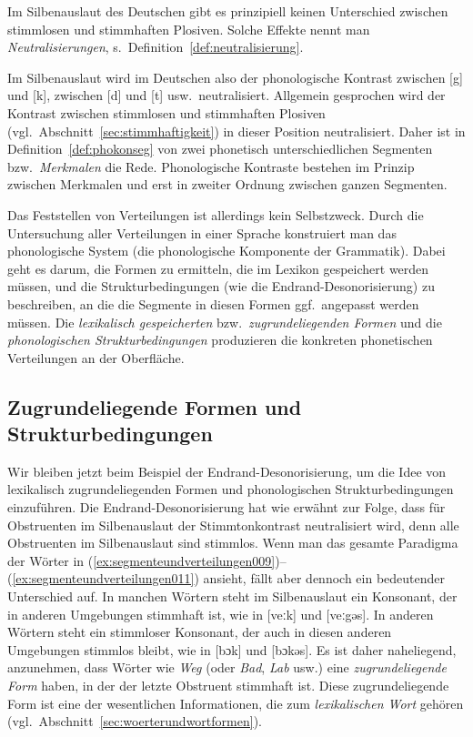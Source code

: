 \Np

Im Silbenauslaut des Deutschen gibt es prinzipiell keinen Unterschied zwischen stimmlosen und stimmhaften Plosiven.
Solche Effekte nennt man \textit{Neutralisierungen}, s.\ Definition~\ref{def:neutralisierung}.


Im Silbenauslaut wird im Deutschen also der phonologische Kontrast zwischen [g] und [k], zwischen [d] und [t] usw.\ neutralisiert.
Allgemein gesprochen wird der Kontrast zwischen stimmlosen und stimmhaften Plosiven (vgl.\ Abschnitt~\ref{sec:stimmhaftigkeit}) in dieser Position neutralisiert.
Daher ist in Definition~\ref{def:phokonseg} von zwei phonetisch unterschiedlichen Segmenten bzw.\ \textit{Merkmalen} die Rede.
Phonologische Kontraste bestehen im Prinzip zwischen Merkmalen und erst in zweiter Ordnung zwischen ganzen Segmenten.

Das Feststellen von Verteilungen ist allerdings kein Selbstzweck.
Durch die Untersuchung aller Verteilungen in einer Sprache konstruiert man das phonologische System (die phonologische Komponente der Grammatik).
Dabei geht es darum, die Formen zu ermitteln, die im Lexikon gespeichert werden müssen, und die Strukturbedingungen (wie die Endrand-Desonorisierung) zu beschreiben, an die die Segmente in diesen Formen ggf.\ angepasst werden müssen.
Die \textit{lexikalisch gespeicherten} bzw.\ \textit{zugrundeliegenden Formen} und die \textit{phonologischen Strukturbedingungen} produzieren die konkreten phonetischen Verteilungen an der Oberfläche.

\subsection{Zugrundeliegende Formen und Strukturbedingungen}
\label{sec:zugrundeliegendeformenundstrukturbedingungen}

Wir bleiben jetzt beim Beispiel der Endrand-Desonorisierung, um die Idee von lexikalisch zugrundeliegenden Formen und phonologischen Strukturbedingungen einzuführen.
Die Endrand-Desonorisierung hat wie erwähnt zur Folge, dass für Obstruenten im Silbenauslaut der Stimmtonkontrast neutralisiert wird, denn alle Obstruenten im Silbenauslaut sind stimmlos.
Wenn man das gesamte Paradigma der Wörter in (\ref{ex:segmenteundverteilungen009})--(\ref{ex:segmenteundverteilungen011}) ansieht, fällt aber dennoch ein bedeutender Unterschied auf.
In manchen Wörtern steht im Silbenauslaut ein Konsonant, der in anderen Umgebungen stimmhaft ist, wie in [veːk] und [veːgəs].
In anderen Wörtern steht ein stimmloser Konsonant, der auch in diesen anderen Umgebungen stimmlos bleibt, wie in [bɔk] und [bɔkəs].
Es ist daher naheliegend, anzunehmen, dass Wörter wie \textit{Weg} (oder \textit{Bad}, \textit{Lab} usw.) eine \textit{zugrundeliegende Form} haben, in der der letzte Obstruent stimmhaft ist.
Diese zugrundeliegende Form ist eine der wesentlichen Informationen, die zum \textit{lexikalischen Wort} gehören (vgl.\ Abschnitt~\ref{sec:woerterundwortformen}).

